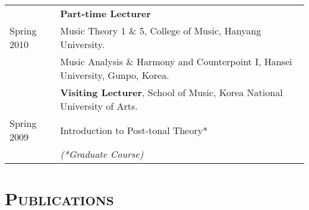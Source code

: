 \documentclass[letter,11pt,draft]{article}
\begin{document}
\begin{tabular}{p{2.5cm} l}
    & \textbf{Part-time Lecturer}\\
    Spring 2010 & Music Theory 1 \& 5, College of Music, Hanyang University.\\
    & Music Analysis \& Harmony and Counterpoint I, Hansei University, Gunpo, Korea.\\[2mm]
    
	& \textbf{Visiting Lecturer}, School of Music, Korea National University of Arts.\\
	Spring 2009 & Introduction to Post-tonal Theory*\\[2mm]
	
	& \textit{(*Graduate Course)}
  \end{tabular}
  
  \vspace{2.5mm}
  
  \section*{\textsc{Publications}}
  
\end{document}
